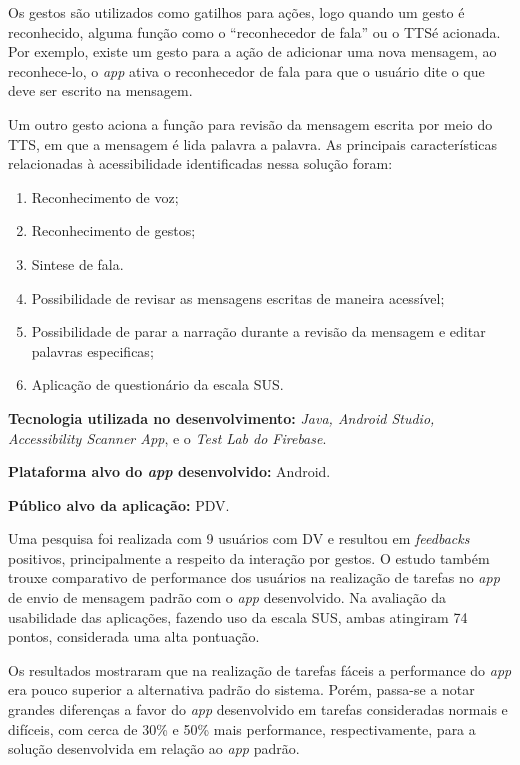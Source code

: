 Os gestos são utilizados como gatilhos para ações, logo quando um gesto é reconhecido, alguma função como o ``reconhecedor de fala'' ou o TTS\@ é acionada.
Por exemplo, existe um gesto para a ação de adicionar uma nova mensagem, ao reconhece-lo, o \emph{app} ativa o reconhecedor de fala para que o usuário dite o que deve ser escrito na mensagem.

Um outro gesto aciona a função para revisão da mensagem escrita por meio do TTS, em que a mensagem é lida palavra a palavra.
As principais características relacionadas à acessibilidade identificadas nessa solução foram:

\begin{enumerate}
    \item Reconhecimento de voz;
    \item Reconhecimento de gestos;
    \item Sintese de fala.
    \item Possibilidade de revisar as mensagens escritas de maneira acessível;
    \item Possibilidade de parar a narração durante a revisão da mensagem e editar palavras especificas;
    \item Aplicação de questionário da escala SUS\@.
\end{enumerate}

\textbf{Tecnologia utilizada no desenvolvimento:} \emph{Java, Android Studio, Accessibility Scanner App}, e o \emph{Test Lab do Firebase}.

\textbf{Plataforma alvo do \emph{app} desenvolvido:} Android.

\textbf{Público alvo da aplicação:} PDV\@.

Uma pesquisa foi realizada com 9 usuários com DV e resultou em \emph{feedbacks} positivos, principalmente a respeito da interação por gestos.
O estudo também trouxe comparativo de performance dos usuários na realização de tarefas no \emph{app} de envio de mensagem padrão com o \emph{app} desenvolvido.
Na avaliação da usabilidade das aplicações, fazendo uso da escala SUS, ambas atingiram 74 pontos, considerada uma alta pontuação.

Os resultados mostraram que na realização de tarefas fáceis a performance do \emph{app} era pouco superior a alternativa padrão do sistema.
Porém, passa-se a notar grandes diferenças a favor do \emph{app} desenvolvido em tarefas consideradas normais e difíceis, com cerca de 30\% e 50\% mais performance, respectivamente, para a solução desenvolvida em relação ao \emph{app} padrão.

